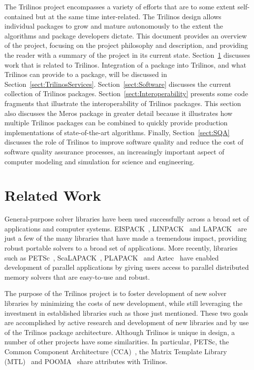 \documentclass[acmtoms,acmnow]{acmtrans2m}
\begin{document}
The Trilinos project encompasses a variety of efforts that are to some
extent self-contained but at the same time inter-related.  The
Trilinos design allows individual packages to grow and mature
autonomously to the extent the algorithms and package developers
dictate.  This document provides an overview of the project,
focusing on the project philosophy and description, and
providing the reader with a summary of the project in its current
state. 
Section~\ref{Sect:RelatedWork} discusses work that is related to Trilinos. 
Integration of a package into Trilinos, and what Trilinos can provide
to a package, will be discussed in Section~\ref{sect:TrilinosServices}.
Section~\ref{sect:Software} discusses the current collection of Trilinos
packages.  Section~\ref{sect:Interoperability} presents some code
fragments that illustrate the interoperability of Trilinos packages.
This section also discusses the Meros package in greater detail
because it illustrates how multiple Trilinos packages can be combined 
to quickly provide production implementations of state-of-the-art 
algorithms.  Finally, Section~\ref{sect:SQA} discusses the role of 
Trilinos to improve software quality and reduce the cost of software 
quality assurance processes, an increasingly important aspect
of computer modeling and simulation for science and engineering.  

\section{Related Work}
\label{Sect:RelatedWork}
General-purpose solver libraries have been used successfully across 
a broad set of applications and computer systems.  EISPACK~\cite{eispack}, 
LINPACK~\cite{linpack} and LAPACK~\cite{lapack} are just a few of
the many libraries that have made a tremendous impact, providing robust 
portable solvers to a broad set of applications.  More recently, libraries 
such as PETSc~\cite{petsc-home-page,petsc-manual,petsc-efficient}, 
ScaLAPACK~\cite{scalapack}, PLAPACK~\cite{plapack} 
and Aztec~\cite{Aztec2.1} have enabled development of parallel
applications by giving users access to parallel distributed 
memory solvers that are easy-to-use and robust.

The purpose of the Trilinos project is to foster development
of new solver libraries by minimizing the costs of new development,
while still leveraging the investment in
established libraries such as those just mentioned.  These two goals
are accomplished by active research and development of new libraries
and by use of the Trilinos package architecture.  Although
Trilinos is unique in design, a number of other projects have some 
similarities.  In particular, PETSc, the Common Component Architecture
(CCA)~\cite{CCA-home-page}, the Matrix
Template Library (MTL)~\cite{MTL-home-page} and POOMA~\cite{POOMA}
share attributes with Trilinos.
\end{document}

